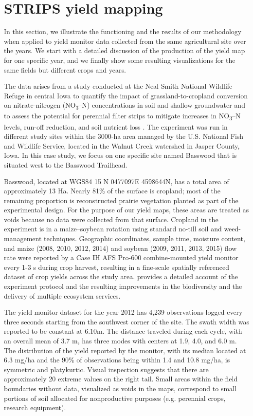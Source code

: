 \chapter{STRIPS yield mapping}

 In this section, we illustrate the
functioning and the results of our methodology when applied to yield
monitor data collected from the same agricultural site over the
years. We start with a detailed discussion of the production of the
yield map for one specific year, and we finally show some resulting
visualizations for the same fields but different crops and years.

 The data arises from a study
conducted at the Neal Smith National Wildlife Refuge in central Iowa
to quantify the impact of grassland-to-cropland conversion on
nitrate-nitrogen (NO\textsubscript{3}–N) concentrations in soil and
shallow groundwater and to assess the potential for perennial filter
strips to mitigate increases in NO\textsubscript{3}–N levels, run-off
reduction, and soil nutrient loss \citep{Zhou2010}. The experiment was
run in different study sites within the 3000-ha area managed by the
U.S. National Fish and Wildlife Service, located in the Walnut Creek
watershed in Jasper County, Iowa. In this case study, we focus on one
specific site named Basswood that is situated west to the Basswood
Trailhead.

 Basswood, located at WGS84 15 N
0477097E 4598644N, has a total area of approximately 13 Ha. Nearly
81\% of the surface is cropland; most of the remaining proportion is
reconstructed prairie vegetation planted as part of the experimental
design. For the purpose of our yield maps, these areas are treated as
voids because no data were collected from that surface. Cropland in the
experiment is in a maize–soybean rotation using standard no-till soil
and weed-management techniques. Geographic coordinates, sample time,
moisture content, and maize (2008, 2010, 2012, 2014) and soybean (2009,
2011, 2013, 2015) flow rate were reported by a Case IH AFS Pro-600
combine-mounted yield monitor every 1-3 s during crop harvest,
resulting in a fine-scale spatially referenced dataset of crop yields
across the study area. \cite{Schulte2017} provides a detailed account
of the experiment protocol and the resulting improvements in the
biodiversity and the delivery of multiple ecosystem services.

 The yield monitor dataset for the year 2012
has 4,239 observations logged every three seconds starting from the
southwest corner of the site. The swath width was reported to be
constant at 6.10m. The distance traveled during each cycle, with
an overall mean of 3.7 m, has three modes with centers at 1.9, 4.0,
and 6.0 m. The distribution of the yield reported by the monitor, with
its median located at 6.3 mg/ha and the 90\% of observations being
within 1.4 and 10.8 mg/ha, is symmetric and platykurtic. Visual
inspection suggests that there are approximately 20 extreme values on
the right tail. Small areas within the field boundaries without data,
visualized as voids in the maps, correspond to small portions of soil
allocated for nonproductive purposes (e.g. perennial crops, research
equipment).

